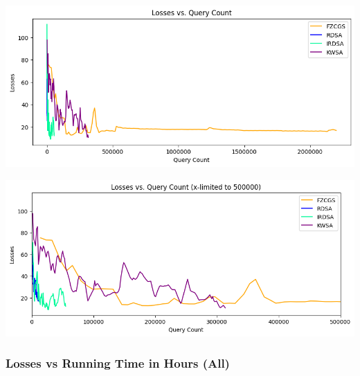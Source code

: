 \documentclass[10pt,twocolumn,letterpaper]{article}
\begin{document}
\begin{center}
   \includegraphics*[scale=0.35]{img/All_loss_vs_querycount.png}
\end{center}
\begin{center}
   \includegraphics*[scale=0.35]{img/xLimit_All_loss_vs_querycount.png}\\
\end{center} 

\subsubsection*{Losses vs Running Time in Hours (All)}
\end{document}
